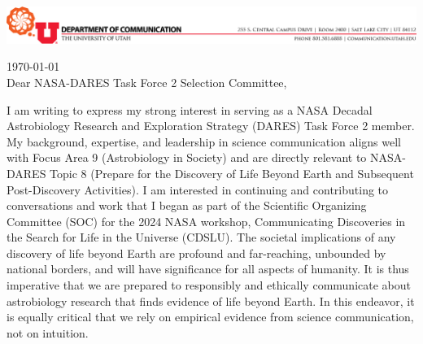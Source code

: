 \documentclass[12pt]{letter}
\begin{document}
\begin{minipage}{4in}
    \vspace{-4em}
    \begin{centering}
        \includegraphics[width=6.5in]{Communication-letterhead.png}
    \end{centering}
    \vspace{0.5em}
\end{minipage}

\vspace{-1.5em}%

\today\\


Dear NASA-DARES Task Force 2 Selection Committee,

I am writing to express my strong interest in serving as a NASA Decadal Astrobiology Research and Exploration Strategy (DARES) Task Force 2 member. My background, expertise, and leadership in science communication aligns well with Focus Area 9 (Astrobiology in Society) and are directly relevant to NASA-DARES Topic 8 (Prepare for the Discovery of Life Beyond Earth and Subsequent Post-Discovery Activities). I am interested in continuing and contributing to conversations and work that I began as part of the Scientific Organizing Committee (SOC) for the 2024 NASA workshop, Communicating Discoveries in the Search for Life in the Universe (CDSLU). The societal implications of any discovery of life beyond Earth are profound and far-reaching, unbounded by national borders, and will have significance for all aspects of humanity. It is thus imperative that we are prepared to responsibly and ethically communicate about astrobiology research that finds evidence of life beyond Earth. In this endeavor, it is equally critical that we rely on empirical evidence from science communication, not on intuition.
\end{document}
